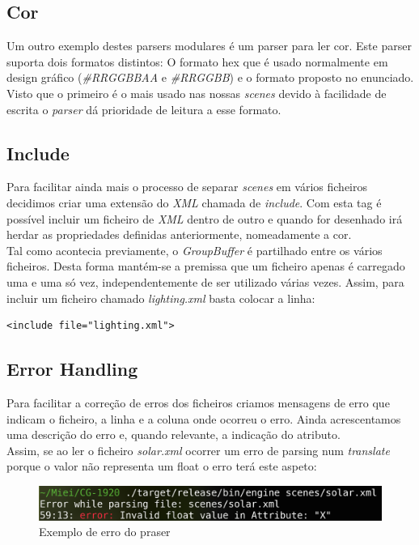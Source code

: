 \documentclass[a4paper]{report}
\begin{document}
\subsection{Cor}
Um outro exemplo destes parsers modulares é um parser para ler cor. Este parser
suporta dois formatos distintos: O formato hex que é usado normalmente em design
gráfico (\textit{\#RRGGBBAA} e \textit{\#RRGGBB}) e o formato proposto no
enunciado. Visto que o primeiro é o mais usado nas nossas \textit{scenes} devido
à facilidade de escrita o \textit{parser} dá prioridade de leitura a esse
formato.

\subsection{Include}
Para facilitar ainda mais o processo de separar \textit{scenes} em vários
ficheiros decidimos criar uma extensão do \textit{XML} chamada de
\textit{include}. Com esta tag é possível incluir um ficheiro de \textit{XML}
dentro de outro e quando for desenhado irá herdar as propriedades definidas
anteriormente, nomeadamente a cor.\\
Tal como acontecia previamente, o \textit{GroupBuffer} é partilhado entre os
vários ficheiros. Desta forma mantém-se a premissa que um ficheiro apenas é
carregado uma e uma só vez, independentemente de ser utilizado várias vezes.
Assim, para incluir um ficheiro chamado \textit{lighting.xml} basta colocar a
linha:

\begin{lstlisting}
<include file="lighting.xml">
\end{lstlisting}

\subsection{Error Handling}
Para facilitar a correção de erros dos ficheiros criamos mensagens de erro que
indicam o ficheiro, a linha e a coluna onde ocorreu o erro. Ainda acrescentamos
uma descrição do erro e, quando relevante, a indicação do atributo.\\
Assim, se ao ler o ficheiro \textit{solar.xml} ocorrer um erro de parsing num
\textit{translate} porque o valor não representa um float o erro terá este
aspeto:
\begin{figure}[H]
    \centering 
    \includegraphics[width=\textwidth]{images/error_handling.png}  
    \caption{Exemplo de erro do praser}
\end{figure}
\end{document}
